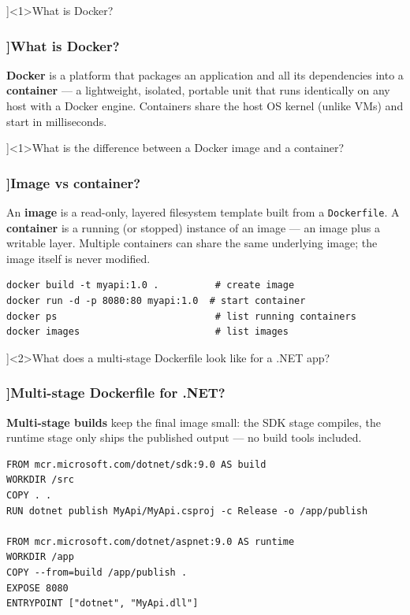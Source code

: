 
\QuestionSlide[\CategoryBadge[DockerColor!20]{Docker \& K8s}]<1>{What is Docker?}

\begin{frame}[fragile]
  \frametitle{\AnswerTitle[\CategoryBadge[DockerColor!20]{Docker \& K8s}]{What is Docker?}}

  {\footnotesize
  \textbf{Docker} is a platform that packages an application and all its dependencies into a \textbf{container} — a lightweight, isolated, portable unit that runs identically on any host with a Docker engine. Containers share the host OS kernel (unlike VMs) and start in milliseconds.
  }
\end{frame}

\QuestionSlide[\CategoryBadge[DockerColor!20]{Docker \& K8s}]<1>{What is the difference between a Docker image and a container?}

\begin{frame}[fragile]
  \frametitle{\AnswerTitle[\CategoryBadge[DockerColor!20]{Docker \& K8s}]{Image vs container?}}

  {\footnotesize
  An \textbf{image} is a read-only, layered filesystem template built from a \texttt{Dockerfile}. A \textbf{container} is a running (or stopped) instance of an image — an image plus a writable layer. Multiple containers can share the same underlying image; the image itself is never modified.
  }

  \begin{verbatim}
docker build -t myapi:1.0 .          # create image
docker run -d -p 8080:80 myapi:1.0  # start container
docker ps                            # list running containers
docker images                        # list images
  \end{verbatim}
\end{frame}

\QuestionSlide[\CategoryBadge[DockerColor!20]{Docker \& K8s}]<2>{What does a multi-stage Dockerfile look like for a .NET app?}

\begin{frame}[fragile]
  \frametitle{\AnswerTitle[\CategoryBadge[DockerColor!20]{Docker \& K8s}]{Multi-stage Dockerfile for .NET?}}

  {\footnotesize
  \textbf{Multi-stage builds} keep the final image small: the SDK stage compiles, the runtime stage only ships the published output — no build tools included.
  }

  \begin{verbatim}
FROM mcr.microsoft.com/dotnet/sdk:9.0 AS build
WORKDIR /src
COPY . .
RUN dotnet publish MyApi/MyApi.csproj -c Release -o /app/publish

FROM mcr.microsoft.com/dotnet/aspnet:9.0 AS runtime
WORKDIR /app
COPY --from=build /app/publish .
EXPOSE 8080
ENTRYPOINT ["dotnet", "MyApi.dll"]
  \end{verbatim}
\end{frame}

